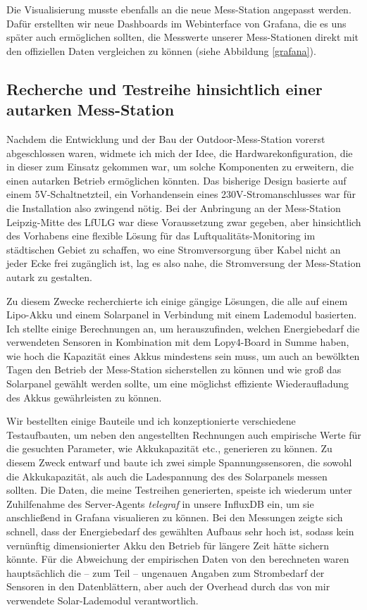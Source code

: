 \documentclass[a4paper,11pt]{article}
\begin{document}
Die Visualisierung musste ebenfalls an die neue Mess-Station angepasst
werden. Dafür erstellten wir neue Dashboards im Webinterface von Grafana, die
es uns später auch ermöglichen sollten, die Messwerte unserer Mess-Stationen
direkt mit den offiziellen Daten vergleichen zu können (siehe Abbildung
\ref{grafana}).

\subsection{Recherche und Testreihe hinsichtlich einer autarken Mess-Station}

Nachdem die Entwicklung und der Bau der Outdoor-Mess-Station vorerst
abgeschlossen waren, widmete ich mich der Idee, die Hardwarekonfiguration, die
in dieser zum Einsatz gekommen war, um solche Komponenten zu erweitern, die
einen autarken Betrieb ermöglichen könnten. Das bisherige Design basierte auf
einem 5V-Schaltnetzteil, ein Vorhandensein eines 230V-Stromanschlusses war für
die Installation also zwingend nötig. Bei der Anbringung an der Mess-Station
Leipzig-Mitte des LfULG war diese Voraussetzung zwar gegeben, aber
hinsichtlich des Vorhabens eine flexible Lösung für das
Luftqualitäts-Monitoring im städtischen Gebiet zu schaffen, wo eine
Stromversorgung über Kabel nicht an jeder Ecke frei zugänglich ist, lag es
also nahe, die Stromversung der Mess-Station autark zu gestalten.

Zu diesem Zwecke recherchierte ich einige gängige Lösungen, die alle auf einem
Lipo-Akku und einem Solarpanel in Verbindung mit einem Lademodul
basierten. Ich stellte einige Berechnungen an, um herauszufinden, welchen
Energiebedarf die verwendeten Sensoren in Kombination mit dem Lopy4-Board in
Summe haben, wie hoch die Kapazität eines Akkus mindestens sein muss, um auch
an bewölkten Tagen den Betrieb der Mess-Station sicherstellen zu können und wie
groß das Solarpanel gewählt werden sollte, um eine möglichst effiziente
Wiederaufladung des Akkus gewährleisten zu können.

Wir bestellten einige Bauteile und ich konzeptionierte verschiedene
Testaufbauten, um neben den angestellten Rechnungen auch empirische Werte für
die gesuchten Parameter, wie Akkukapazität etc., generieren zu können. Zu
diesem Zweck entwarf und baute ich zwei simple Spannungssensoren, die sowohl
die Akkukapazität, als auch die Ladespannung des des Solarpanels messen
sollten. Die Daten, die meine Testreihen generierten, speiste ich wiederum
unter Zuhilfenahme des Server-Agents \textit{telegraf} in unsere InfluxDB ein,
um sie anschließend in Grafana visualieren zu können. Bei den Messungen zeigte
sich schnell, dass der Energiebedarf des gewählten Aufbaus sehr hoch ist,
sodass kein vernünftig dimensionierter Akku den Betrieb für längere Zeit hätte
sichern könnte. Für die Abweichung der empirischen Daten von den berechneten
waren hauptsächlich die -- zum Teil -- ungenauen Angaben zum Strombedarf der
Sensoren in den Datenblättern, aber auch der Overhead durch das von mir
verwendete Solar-Lademodul verantwortlich.
\end{document}
